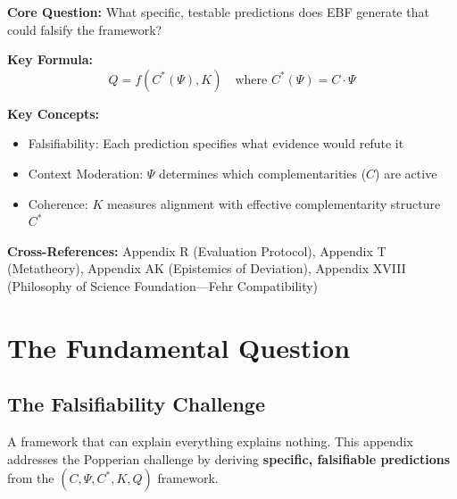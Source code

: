 
\begin{tcolorbox}[colback=blue!5!white, colframe=blue!75!black,
    title=Quick Reference: Falsifiable Predictions]

\textbf{Core Question:} What specific, testable predictions does EBF generate that could falsify the framework?

\textbf{Key Formula:}
\begin{equation}
Q = f(C^*(\Psi), K) \quad \text{where } C^*(\Psi) = C \cdot \Psi
\end{equation}

\textbf{Key Concepts:}
\begin{itemize}[nosep]
\item Falsifiability: Each prediction specifies what evidence would refute it
\item Context Moderation: $\Psi$ determines which complementarities ($C$) are active
\item Coherence: $K$ measures alignment with effective complementarity structure $C^*$
\end{itemize}

\textbf{Cross-References:} Appendix R (Evaluation Protocol), Appendix T (Metatheory), Appendix AK (Epistemics of Deviation), Appendix XVIII (Philosophy of Science Foundation---Fehr Compatibility)
\end{tcolorbox}



\section{The Fundamental Question}
\label{sec:S-fundamental}

\subsection{The Falsifiability Challenge}

A framework that can explain everything explains nothing. This appendix addresses the Popperian challenge by deriving \textbf{specific, falsifiable predictions} from the $(C, \Psi, C^*, K, Q)$ framework.


